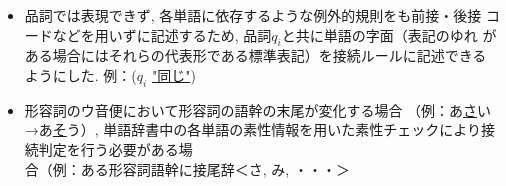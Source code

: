 \begin{itemize}
\item 品詞では表現できず, 各単語に依存するような例外的規則をも前接・後接
コードなどを用いずに記述するため, 品詞\(q_{i}\)と共に単語の字面（表記のゆれ
がある場合にはそれらの代表形である標準表記）を接続ルールに記述できる
ようにした.  例：(\(q_{i}\) \underline{"同じ"})

\item 形容詞のウ音便において形容詞の語幹の末尾が変化する場合
（例：あ\hspace*{-0.2mm}\underline{さ}\hspace*{-0.2mm}い→あ\hspace*{-0.2mm}\underline{そ}\hspace*{-0.2mm}う）, 
単\hspace*{0.05mm}語\hspace*{0.05mm}辞\hspace*{0.05mm}書\hspace*{0.05mm}中\hspace*{0.05mm}の\hspace*{0.05mm}各\hspace*{0.05mm}単\hspace*{0.05mm}語\hspace*{0.05mm}の\hspace*{0.05mm}素\hspace*{0.05mm}性\hspace*{0.05mm}情\hspace*{0.05mm}報\hspace*{0.05mm}を\hspace*{0.05mm}用\hspace*{0.05mm}い\hspace*{0.05mm}た\hspace*{0.05mm}素\hspace*{0.05mm}性\hspace*{0.05mm}チ\hspace*{0.05mm}ェ\hspace*{0.05mm}ッ\hspace*{0.05mm}ク\hspace*{0.05mm}に\hspace*{0.05mm}よ\hspace*{0.05mm}り\hspace*{0.05mm}接
続判定を行う必要がある場\\合（例：ある形容詞語幹に接尾辞＜\hspace{-0.2mm}さ, \hspace{-0.2mm}み, \hspace{-0.2mm}・\hspace{-.5em}・\hspace{-.5em}・\hspace{-0.1mm}＞\hspace{-0.1mm}

\end{itemize}
